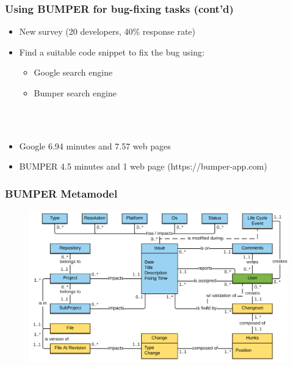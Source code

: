 \documentclass{beamer}
\begin{document}
\begin{frame}

  \frametitle{Using BUMPER for bug-fixing tasks (cont'd)}


  \begin{itemize}
    \item New survey (20 developers, 40\%  response rate)
    \item Find a suitable code snippet to fix the bug using:
    \begin{itemize}
      \item Google search engine
      \item Bumper search engine
    \end{itemize}
  \end{itemize}
  \\ \\
  \begin{itemize}
    \item Google 6.94 minutes and 7.57 web pages
    \item BUMPER 4.5 minutes and 1 web page (https://bumper-app.com)
  \end{itemize}

\end{frame}

\begin{frame}

  \frametitle{BUMPER Metamodel}

  \begin{figure}
    \centering
    \includegraphics[width=1\textwidth]{../media/Bumper-Model.png}
  \vspace{-1.8em}
  \end{figure}

\end{frame}
\end{document}
